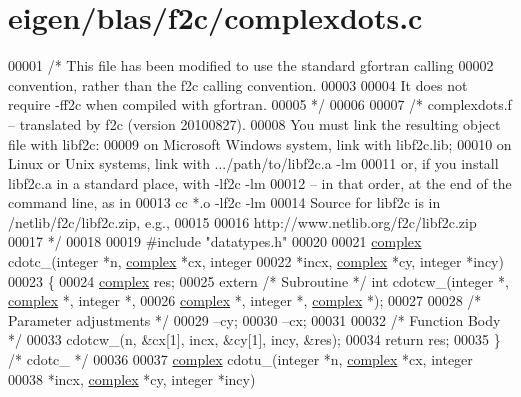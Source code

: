 \hypertarget{eigen_2blas_2f2c_2complexdots_8c_source}{}\section{eigen/blas/f2c/complexdots.c}
\label{eigen_2blas_2f2c_2complexdots_8c_source}

\begin{DoxyCode}
00001 \textcolor{comment}{/* This file has been modified to use the standard gfortran calling}
00002 \textcolor{comment}{   convention, rather than the f2c calling convention.}
00003 \textcolor{comment}{}
00004 \textcolor{comment}{   It does not require -ff2c when compiled with gfortran.}
00005 \textcolor{comment}{*/}
00006 
00007 \textcolor{comment}{/* complexdots.f -- translated by f2c (version 20100827).}
00008 \textcolor{comment}{   You must link the resulting object file with libf2c:}
00009 \textcolor{comment}{    on Microsoft Windows system, link with libf2c.lib;}
00010 \textcolor{comment}{    on Linux or Unix systems, link with .../path/to/libf2c.a -lm}
00011 \textcolor{comment}{    or, if you install libf2c.a in a standard place, with -lf2c -lm}
00012 \textcolor{comment}{    -- in that order, at the end of the command line, as in}
00013 \textcolor{comment}{        cc *.o -lf2c -lm}
00014 \textcolor{comment}{    Source for libf2c is in /netlib/f2c/libf2c.zip, e.g.,}
00015 \textcolor{comment}{}
00016 \textcolor{comment}{        http://www.netlib.org/f2c/libf2c.zip}
00017 \textcolor{comment}{*/}
00018 
00019 \textcolor{preprocessor}{#include "datatypes.h"}
00020 
00021 \hyperlink{structcomplex}{complex} cdotc\_(integer *n, \hyperlink{structcomplex}{complex} *cx, integer 
00022     *incx, \hyperlink{structcomplex}{complex} *cy, integer *incy)
00023 \{
00024     \hyperlink{structcomplex}{complex} res;
00025     \textcolor{keyword}{extern} \textcolor{comment}{/* Subroutine */} \textcolor{keywordtype}{int} cdotcw\_(integer *, \hyperlink{structcomplex}{complex} *, integer *, 
00026         \hyperlink{structcomplex}{complex} *, integer *, \hyperlink{structcomplex}{complex} *);
00027 
00028     \textcolor{comment}{/* Parameter adjustments */}
00029     --cy;
00030     --cx;
00031 
00032     \textcolor{comment}{/* Function Body */}
00033     cdotcw\_(n, &cx[1], incx, &cy[1], incy, &res);
00034     \textcolor{keywordflow}{return} res;
00035 \} \textcolor{comment}{/* cdotc\_ */}
00036 
00037 \hyperlink{structcomplex}{complex} cdotu\_(integer *n, \hyperlink{structcomplex}{complex} *cx, integer 
00038     *incx, \hyperlink{structcomplex}{complex} *cy, integer *incy)

\end{DoxyCode}
